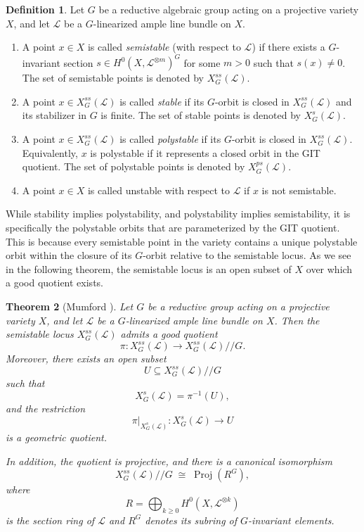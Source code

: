 \documentclass[12pt, reqno]{amsart}
\theoremstyle{plain}
\numberwithin{equation}{section}
\newtheorem{theorem}{Theorem}[section]
\theoremstyle{definition}
\newtheorem{definition}[theorem]{Definition}
\begin{document}
\begin{definition}
Let $G$ be a reductive algebraic group acting on a projective variety $X$, and let
$\mathcal L$ be a $G$-linearized ample line bundle on $X$.

\begin{enumerate}
    \item A point $x\in X$ is called \emph{semistable} (with respect to $\mathcal L$) if there exists
    a $G$-invariant section $s\in H^0(X,\mathcal L^{\otimes m})^G$ for some $m>0$ such that
    $s(x)\neq 0$. The set of semistable points is denoted by $X_G^{ss}(\mathcal L)$.

    \item A point $x\in X_G^{ss}(\mathcal L)$ is called \emph{stable} if its $G$-orbit is closed in
    $X_G^{ss}(\mathcal L)$ and its stabilizer in $G$ is finite. The set of stable points is denoted by
    $X_G^s(\mathcal L)$.

    \item A point $x\in X_G^{ss}(\mathcal L)$ is called \emph{polystable} if its $G$-orbit is closed in
    $X_G^{ss}(\mathcal L)$. Equivalently, $x$ is polystable if it represents a closed orbit in the GIT
    quotient. The set of polystable points is denoted by $X_G^{ps}(\mathcal L)$.

    \item A point $x \in X$ is called unstable with respect to $\mathcal L$ if $x$ is not semistable.
\end{enumerate}
\end{definition}

While stability implies polystability, and polystability implies semistability, it is specifically the polystable orbits that are parameterized by the GIT quotient. This is because every semistable point in the variety contains a unique polystable orbit within the closure of its $G$-orbit relative to the semistable locus.  As we see in the following theorem, the semistable locus is an open subset of 
$X$ over which a good quotient exists.

\begin{theorem}[Mumford \cite{GIT}]
Let $G$ be a reductive group acting on a projective variety $X$, and let
$\mathcal L$ be a $G$-linearized ample line bundle on $X$. Then the semistable
locus $X_G^{ss}(\mathcal L)$ admits a good quotient
\[
\pi : X_G^{ss}(\mathcal L)\longrightarrow X_G^{ss}(\mathcal L)//G.
\]
Moreover, there exists an open subset
\[
U \subseteq X_G^{ss}(\mathcal L)//G
\]
such that
\[
X_G^s(\mathcal L)=\pi^{-1}(U),
\]
and the restriction
\[
\pi|_{X_G^s(\mathcal L)} : X_G^s(\mathcal L)\longrightarrow U
\]
is a geometric quotient.

In addition, the quotient is projective, and there is a canonical isomorphism
\[
X_G^{ss}(\mathcal L)//G \;\cong\; \operatorname{Proj}(R^G),
\]
where
\[
R=\bigoplus_{k\ge 0} H^0\!\left(X,\mathcal L^{\otimes k}\right)
\]
is the section ring of $\mathcal L$ and $R^G$ denotes its subring of $G$-invariant
elements.
\end{theorem}
\end{document}
